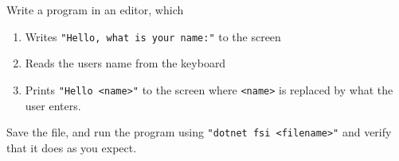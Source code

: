 Write a program in an editor, which
\begin{enumerate}
\item Writes \lstinline[language=console]{"Hello, what is your name:"} to the screen
\item Reads the users name from the keyboard
\item Prints \lstinline[language=console]{"Hello <name>"} to the screen where \lstinline[language=console]{<name>} is replaced by what the user enters.
\end{enumerate}
Save the file, and run the program using \lstinline[language=console]{"dotnet fsi <filename>"} and verify that it does as you expect.